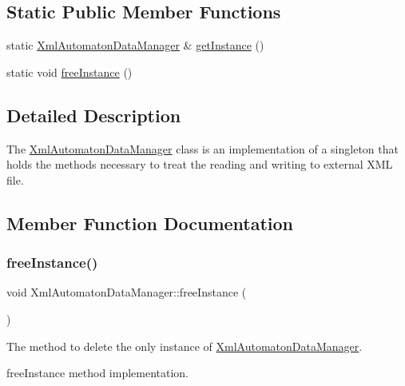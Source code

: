\subsection*{Static Public Member Functions}
\begin{DoxyCompactItemize}
\item 
static \mbox{\hyperlink{class_xml_automaton_data_manager}{Xml\+Automaton\+Data\+Manager}} \& \mbox{\hyperlink{class_xml_automaton_data_manager_a69a86fb89604a85a93f411a058c7828e}{get\+Instance}} ()
\item 
static void \mbox{\hyperlink{class_xml_automaton_data_manager_a3fa4f7bd24f5e07015b4092e840ca092}{free\+Instance}} ()
\end{DoxyCompactItemize}


\subsection{Detailed Description}
The \mbox{\hyperlink{class_xml_automaton_data_manager}{Xml\+Automaton\+Data\+Manager}} class is an implementation of a singleton that holds the methods necessary to treat the reading and writing to external X\+ML file. 

\subsection{Member Function Documentation}
\mbox{\label{class_xml_automaton_data_manager_a3fa4f7bd24f5e07015b4092e840ca092}} 
\subsubsection{\texorpdfstring{free\+Instance()}{freeInstance()}}
{\footnotesize\ttfamily void Xml\+Automaton\+Data\+Manager\+::free\+Instance (\begin{DoxyParamCaption}{ }\end{DoxyParamCaption})\hspace{0.3cm}{\ttfamily [static]}}

The method to delete the only instance of \mbox{\hyperlink{class_xml_automaton_data_manager}{Xml\+Automaton\+Data\+Manager}}.

free\+Instance method implementation. \mbox{\label{class_xml_automaton_data_manager_a69a86fb89604a85a93f411a058c7828e}} 
